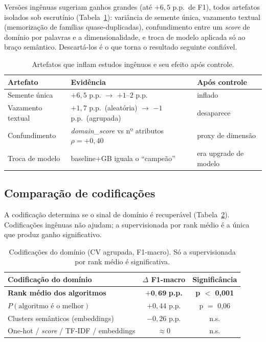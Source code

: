 \documentclass[12pt]{article}
\begin{document}
Versões ingênuas sugeriam ganhos grandes (até $+6{,}5$ p.p.\ de F1), todos
artefatos isolados sob escrutínio (Tabela~\ref{tab:artefatos}): variância de
semente única, vazamento textual (memorização de famílias quase-duplicadas),
confundimento entre um \textit{score} de domínio por palavras e a dimensionalidade,
e troca de modelo aplicada só ao braço semântico. Descartá-los é o que torna o
resultado seguinte confiável.

\begin{table}[H]
\centering
\caption{Artefatos que inflam estudos ingênuos e seu efeito após controle.}
\label{tab:artefatos}
\begin{tabular}{lll}
\toprule
Artefato & Evidência & Após controle \\
\midrule
Semente única & $+6{,}5$ p.p. $\rightarrow$ $+1$--$2$ p.p. & inflado \\
Vazamento textual & $+1{,}7$ p.p.\ (aleatória) $\rightarrow$ $-1$ p.p.\ (agrupada) & desaparece \\
Confundimento & \textit{domain\_score} vs nº atributos $\rho=+0{,}40$ & proxy de dimensão \\
Troca de modelo & baseline+GB iguala o ``campeão'' & era upgrade de modelo \\
\bottomrule
\end{tabular}
\end{table}

\subsection{Comparação de codificações}

A codificação determina se o sinal de domínio é recuperável
(Tabela~\ref{tab:cod}). Codificações ingênuas não ajudam; a supervisionada por
rank médio é a única que produz ganho significativo.

\begin{table}[H]
\centering
\caption{Codificações do domínio (CV agrupada, F1-macro). Só a supervisionada por
rank médio é significativa.}
\label{tab:cod}
\begin{tabular}{lcc}
\toprule
Codificação do domínio & $\Delta$ F1-macro & Significância \\
\midrule
\textbf{Rank médio dos algoritmos} & $\mathbf{+0{,}69}$ \textbf{p.p.} & \textbf{p $<$ 0,001} \\
$P(\text{algoritmo é o melhor})$ & $+0{,}44$ p.p. & p $=$ 0,06 \\
Clusters semânticos (embeddings) & $-0{,}26$ p.p. & n.s. \\
One-hot / \textit{score} / TF-IDF / embeddings & $\approx 0$ & n.s. \\
\bottomrule
\end{tabular}
\end{table}
\end{document}
